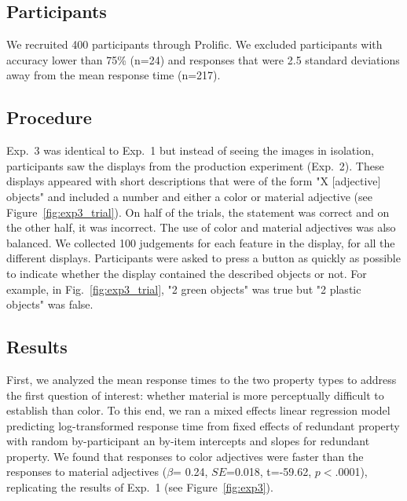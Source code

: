\documentclass[12pt,letterpaper]{article}
\newcommand{\jd}[1]{\textcolor{Pink}{[jd: #1]}}
\begin{document}
\subsection{Participants} 

We recruited 400 participants through Prolific. We excluded participants with accuracy lower than 75\% (n=24) and responses that were 2.5 standard deviations away from the mean response time (n=217).
\subsection{Procedure} 

Exp.~3 was identical to Exp.~1 but instead of seeing the images in isolation, participants saw the displays from the production experiment (Exp.~2). These displays appeared with short descriptions that were of the form "X [adjective] objects" and included a number and either a color or material adjective (see Figure~\ref{fig:exp3_trial}). On half of the trials, the statement was correct and on the other half, it was incorrect. The use of color and material adjectives was also balanced. We collected 100 judgements for each feature in the display, for all the different displays. Participants were asked to press a button as quickly as possible to indicate whether the display contained the described objects or not. For example, in Fig.~\ref{fig:exp3_trial}, "2 green objects" was true but "2 plastic objects" was false.

\subsection{Results} 

First, we analyzed the mean response times to the two property types to address the first question of interest: whether material is more perceptually difficult to establish than color. To this end, we ran a mixed effects linear regression model predicting log-transformed response time from fixed effects of redundant property with random by-participant an by-item intercepts and slopes for redundant property. We found that responses to color adjectives were faster than the responses to material adjectives ($\beta$= 0.24, $SE$=0.018, t=-59.62, $p$$<$.0001), replicating the results of Exp.~1 (see Figure~\ref{fig:exp3}). 
\end{document}

